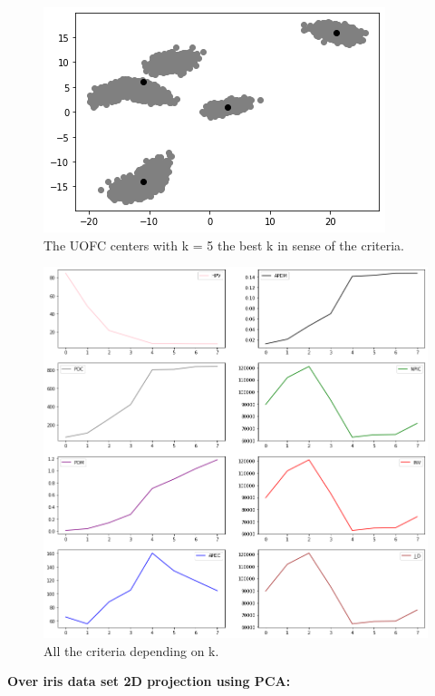 \documentclass[12pt, a4paper]{paper}
\begin{document}
\begin{figure}[h!]
\centering
\includegraphics[scale=0.7]{UOFC_gaussians.png}
\caption{The UOFC centers with k = 5 the best k in sense of the criteria.}
\label{fig:Circular_3}
\end{figure}

\newpage

\begin{figure}[h!]
\centering
\includegraphics[scale=0.4]{UOFC_gaussians_plot.png}
\caption{All the criteria depending on k.}
\label{fig:Circular_3}
\end{figure}

\newpage


\textbf{Over iris data set 2D projection using PCA:}
\end{document}
